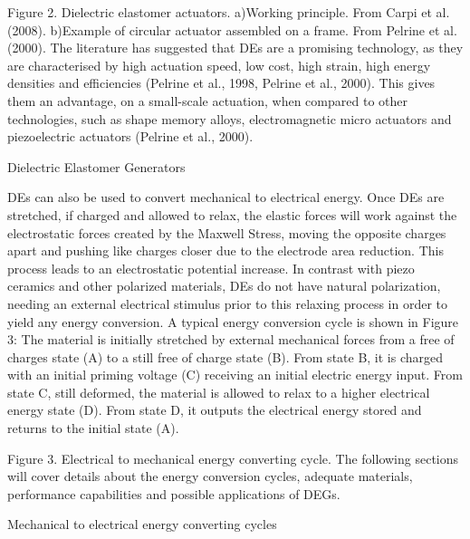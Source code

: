 Figure 2. Dielectric elastomer actuators. a)Working principle. From Carpi et al. (2008). b)Example of circular actuator assembled on a frame. From Pelrine et al. (2000).
The literature has suggested that DEs are a promising technology, as they are characterised by high actuation speed, low cost, high strain, high energy densities and efficiencies (Pelrine et al., 1998, Pelrine et al., 2000). This gives them an advantage, on a small-scale actuation,  when compared to other technologies, such as shape memory alloys, electromagnetic micro actuators and piezoelectric actuators (Pelrine et al., 2000). 

Dielectric Elastomer Generators

DEs can also be used to convert mechanical to electrical energy. Once DEs are stretched, if charged and allowed to relax, the elastic forces will work against the electrostatic forces created by the Maxwell Stress, moving the opposite charges apart and pushing like charges closer due to the electrode area reduction. This process leads to an electrostatic potential increase.
In contrast with piezo ceramics and other polarized materials, DEs do not have natural polarization, needing an external electrical stimulus prior to this relaxing process in order to yield any energy conversion.  A typical energy conversion cycle is shown in Figure 3: The material is initially stretched by external mechanical forces from a free of charges state (A) to a still free of charge state (B). From state B, it is charged with an initial priming voltage (C) receiving an initial electric energy input. From state C, still deformed, the material is allowed to relax to a higher electrical energy state (D). From state D, it outputs the electrical energy stored and returns to the initial state (A).
 
Figure 3. Electrical to mechanical energy converting cycle.
	The following sections will cover details about the energy conversion cycles, adequate materials, performance capabilities and possible applications of DEGs.

Mechanical to electrical energy converting cycles

